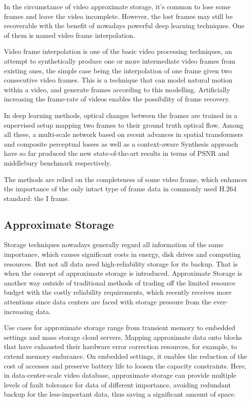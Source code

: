 \documentclass[sigconf]{acmart}
\begin{document}
In the circumstance of video approximate storage, it's common to lose some frames and leave the video incomplete. However, the lost frames may still be recoverable with the benefit of nowadays powerful deep learning techniques. One of them is named video frame interpolation.

Video frame interpolation is one of the basic video processing techniques, an attempt to synthetically produce one or more intermediate video frames from existing ones, the simple case being the interpolation of one frame given two consecutive video frames. This is a technique that can model natural motion within a video, and generate frames according to this modelling. Artificially increasing the frame-rate of videos enables the possibility of frame recovery.


In deep learning methods, optical changes between the frames are trained in a supervised setup mapping two frames to their ground truth optical flow. Among all these, a multi-scale network\cite{van2017frame} based on recent advances in spatial transformers and composite perceptual losses as well as a context-aware Synthesis approach\cite{niklaus2018context} have so far produced the new state-of-the-art results in terms of PSNR and middlebury benchmark respectively.


The methods are relied on the completeness of some video frame, which enhances the importance of the only intact type of frame data in commonly used H.264 standard: the I frame.


\subsection{Approximate Storage}
Storage techniques nowadays generally regard all information of the same importance, which causes significant costs in energy, disk drives and computing resources. But not all data need high-reliability storage for its backup. That is when the concept of approximate storage is introduced. Approximate Storage is another way outside of traditional methods of trading off the limited resource budget with the costly reliability requirements, which recently receives more attentions since data centers are faced with storage pressure from the ever-increasing data.

Use cases for approximate storage range from transient memory to embedded settings and mass storage cloud servers. Mapping approximate data onto blocks that have exhausted their hardware error correction resources, for example, to extend memory endurance. On embedded settings, it enables the reduction of the cost of accesses and preserve battery life to loosen the capacity constraints. \cite{sampson2014approximate} Here, in data-center-scale video database, approximate storage can provide multiple levels of fault tolerance for data of different importance, avoiding redundant backup for the less-important data, thus saving a significant amount of space.
\end{document}
